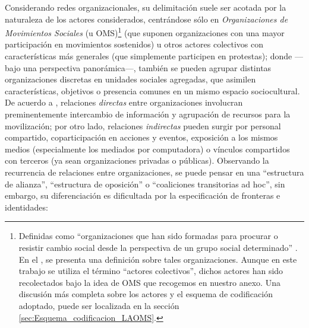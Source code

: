 \documentclass[letterpaper, 11pt]{book}
\theoremstyle{definition}
\theoremstyle{remark}
\begin{document}
Considerando redes organizacionales, su delimitación suele ser acotada por la naturaleza de los actores considerados, centrándose sólo en \emph{Organizaciones de Movimientos Sociales} (u OMS)\footnote{
    Definidas como ``organizaciones que han sido formadas para procurar o resistir cambio social desde la perspectiva de un grupo social determinado'' \citep[5]{2016_Cadena_OMS}. 
    En el , se presenta una definición sobre tales organizaciones. 
    Aunque en este trabajo se utiliza el término ``actores colectivos'', dichos actores han sido recolectados bajo la idea de OMS que recogemos en nuestro anexo. 
    Una discusión más completa sobre los actores y el esquema de codificación adoptado, puede ser localizada en la sección \ref{sec:Esquema_codificacion_LAOMS}.
} 
(que suponen organizaciones con una mayor participación en movimientos sostenidos) u otros actores colectivos con características más generales (que simplemente participen en protestas); 
donde ---bajo una perspectiva panorámica---, también se pueden agrupar distintas organizaciones discretas en unidades sociales agregadas, que asimilen características, objetivos o presencia comunes en un mismo espacio sociocultural. 
De acuerdo a \citet{2003_Diani_SocialNetworks}, relaciones \emph{directas} entre organizaciones involucran preminentemente intercambio de información y agrupación de recursos para la movilización; 
por otro lado, relaciones \emph{indirectas} pueden surgir por personal compartido, coparticipación en acciones y eventos, exposición a los mismos medios (especialmente los mediados por computadora) o vínculos compartidos con terceros (ya sean organizaciones privadas o públicas).
Observando la recurrencia de relaciones entre organizaciones, se puede pensar en una ``estructura de alianza'', ``estructura de oposición'' o ``coaliciones transitorias ad hoc'', sin embargo, su diferenciación es dificultada por la especificación de fronteras e identidades: 
\end{document}
